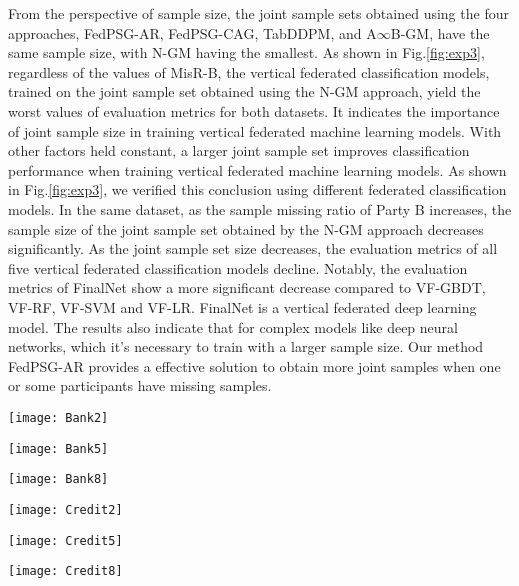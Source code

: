 \documentclass[final,1p,times]{elsarticle}
\begin{document}
 From the perspective of sample size, the joint sample sets obtained using the four approaches, FedPSG-AR, FedPSG-CAG, TabDDPM, and A$\infty$B-GM, have the same sample size, with N-GM having the smallest. As shown in Fig.\ref{fig:exp3}, regardless of the values of MisR-B, the vertical federated classification models, trained on the joint sample set obtained using the N-GM approach, yield the worst values of evaluation metrics for both datasets. It indicates the importance of joint sample size in training vertical federated machine learning models. With other factors held constant, a larger joint sample set improves classification performance when training vertical federated machine learning models. As shown in Fig.\ref{fig:exp3}, we verified this conclusion using different federated classification models. In the same dataset, as the sample missing ratio of Party B increases, the sample size of the joint sample set obtained by the N-GM approach decreases significantly. As the joint sample set size decreases, the evaluation metrics of all five vertical federated classification models decline. Notably, the evaluation metrics of FinalNet show a more significant decrease compared to VF-GBDT, VF-RF, VF-SVM and VF-LR. FinalNet is a vertical federated deep learning model. The results also indicate that for complex models like deep neural networks, which it's necessary to train with a larger sample size. Our method FedPSG-AR provides a effective solution to obtain more joint samples when one or some participants have missing samples.
\begin{figure*}[p]
	\centering 
	\begin{minipage}[b]{0.73\textwidth} 
		\centering
		\label{fig:bank2}
		\texttt{[image: Bank2]} 
	\end{minipage}
	\hfill
	\begin{minipage}[b]{0.73\textwidth} 
		\centering
		\label{fig:bank5}
		\texttt{[image: Bank5]} 
	\end{minipage}
	\hfill  
	\begin{minipage}[b]{0.73\textwidth} 
		\centering
		\label{fig:bank8}
		\texttt{[image: Bank8]} 
	\end{minipage}
	\hfill  
	\begin{minipage}[b]{0.73\textwidth} 
		\centering
		\label{fig:Credit2}
		\texttt{[image: Credit2]} 
	\end{minipage}
	\hfill  
	\begin{minipage}[b]{0.73\textwidth} 
		\centering
		\label{fig:Credit5}
		\texttt{[image: Credit5]} 
	\end{minipage}
	\hfill  
	\begin{minipage}[b]{0.73\textwidth} 
		\centering
		\label{fig:Credit8}
		\texttt{[image: Credit8]} 
	\end{minipage}
	\caption{The verification results of different vertical federated classification models}
	\label{fig:exp3}
\end{figure*}
\end{document}
